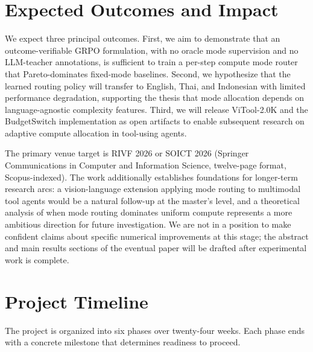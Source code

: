 \documentclass[11pt,a4paper]{article}
\begin{document}
\section{Expected Outcomes and Impact}

We expect three principal outcomes. First, we aim to demonstrate that an outcome-verifiable GRPO formulation, with no oracle mode supervision and no LLM-teacher annotations, is sufficient to train a per-step compute mode router that Pareto-dominates fixed-mode baselines. Second, we hypothesize that the learned routing policy will transfer to English, Thai, and Indonesian with limited performance degradation, supporting the thesis that mode allocation depends on language-agnostic complexity features. Third, we will release ViTool-2.0K and the BudgetSwitch implementation as open artifacts to enable subsequent research on adaptive compute allocation in tool-using agents.

The primary venue target is RIVF 2026 or SOICT 2026 (Springer Communications in Computer and Information Science, twelve-page format, Scopus-indexed). The work additionally establishes foundations for longer-term research arcs: a vision-language extension applying mode routing to multimodal tool agents would be a natural follow-up at the master's level, and a theoretical analysis of when mode routing dominates uniform compute represents a more ambitious direction for future investigation. We are not in a position to make confident claims about specific numerical improvements at this stage; the abstract and main results sections of the eventual paper will be drafted after experimental work is complete.

\section{Project Timeline}

The project is organized into six phases over twenty-four weeks. Each phase ends with a concrete milestone that determines readiness to proceed.
\end{document}
